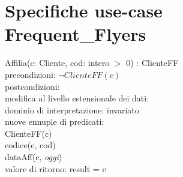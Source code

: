 \documentclass[a4paper,12pt]{report}
\begin{document}
        \section{Specifiche use-case Frequent\_Flyers}
        \hspace*{1cm}Affilia(c: Cliente, cod: intero $>$ 0) : ClienteFF \\
        \hspace*{2cm}precondizioni: $\neg ClienteFF(c)$ \\
        \hspace*{2cm}postcondizioni: \\
        \hspace*{3cm}modifica al livello estensionale dei dati: \\
        \hspace*{4cm}dominio di interpretazione: invariato \\
        \hspace*{4cm}nuove ennuple di predicati: \\
        \hspace*{5cm}ClienteFF(c) \\
        \hspace*{5cm}codice(c, cod) \\
        \hspace*{5cm}dataAff(c, \textit{oggi}) \\
        \hspace*{3cm}valore di ritorno: result = c \\ \\
\end{document}
